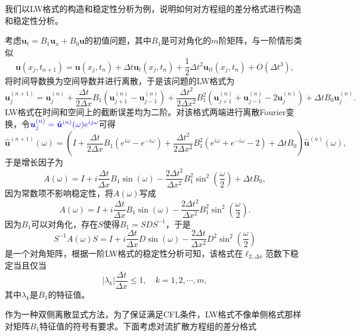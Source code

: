 \documentclass[a4paper,10pt]{ctexart}
\begin{document}
我们以LW格式的构造和稳定性分析为例，说明如何对方程组的差分格式进行构造和稳定性分析。
\begin{example}
    考虑$ \bm{u}_t = B_1 \bm{u}_x + B_0 \bm{u} $的初值问题，其中$ B_1 $是可对角化的$ m $阶矩阵，与一阶情形类似
    \[
        \bm{u}(x_j,t_{n+1}) = \bm{u}(x_j,t_n) + \Delta t \bm{u}_t(x_j,t_n) + \frac{1}{2}\Delta t^2 \bm{u}_{tt}(x_j,t_n) + O(\Delta t^3),
    \]
    将时间导数换为空间导数并进行离散，于是该问题的LW格式为
    \begin{equation}
        \bm{u}^{(n+1)}_j = \bm{u}^{(n)}_j + \frac{\Delta t}{2\Delta x}B_1(\bm{u}^{(n)}_{j+1}-\bm{u}^{(n)}_{j-1}) + \frac{\Delta t^2}{2\Delta x^2}B_1^2(\bm{u}^{(n)}_{j+1}+\bm{u}^{(n)}_{j-1}-2\bm{u}^{(n)}_j) + \Delta t B_0 \bm{u}^{(n)}_j.
    \end{equation}
    LW格式在时间和空间上的截断误差均为二阶。对该格式两端进行离散Fourier变换，令$ \textcolor{blue}{\bm{u}^{(n)}_j = \hat{\bm{u}}^{(n)}(\omega)e^{i j\omega}} $可得
    \begin{equation}
        \hat{\bm{u}}^{(n+1)}(\omega) = \left( I + \frac{\Delta t}{2\Delta x}B_1(e^{i\omega}-e^{-i\omega}) + \frac{\Delta t^2}{2\Delta x^2}B_1^2(e^{i\omega}+e^{-i\omega}-2) + \Delta t B_0 \right) \hat{\bm{u}}^{(n)}(\omega),
    \end{equation}
    于是增长因子为
    \begin{equation}
        A(\omega) = I + i\frac{\Delta t}{\Delta x}B_1 \sin(\omega) - \frac{2\Delta t^2}{\Delta x^2}B_1^2 \sin^2(\frac{\omega}{2}) + \Delta t B_0,
    \end{equation}
    因为常数项不影响稳定性，将$ A(\omega) $写成
    \[
        A(\omega) = I + i\frac{\Delta t}{\Delta x}B_1 \sin(\omega) - \frac{2\Delta t^2}{\Delta x^2}B_1^2 \sin^2(\frac{\omega}{2}).
    \]
    因为$ B_1 $可以对角化，存在$ S $使得$ B_1 = SDS^{-1} $，于是
    \[
        S^{-1}A(\omega)S = I + i\frac{\Delta t}{\Delta x}D \sin(\omega) - \frac{2\Delta t}{\Delta x^2}D^2 \sin^2(\frac{\omega}{2})
    \]
    是一个对角矩阵，根据一阶LW格式的稳定性分析可知，该格式在$ \ell_{2,\Delta x} $范数下稳定当且仅当
    \begin{equation}
        |\lambda_k| \frac{\Delta t}{\Delta x} \leqslant 1,\quad k=1,2,\cdots ,m,
    \end{equation}
    其中$ \lambda_k $是$ B_1 $的特征值。
\end{example}
作为一种双侧离散显式方法，为了保证满足CFL条件，LW格式不像单侧格式那样对矩阵$ B_1 $特征值的符号有要求。下面考虑对流扩散方程组的差分格式
\end{document}
